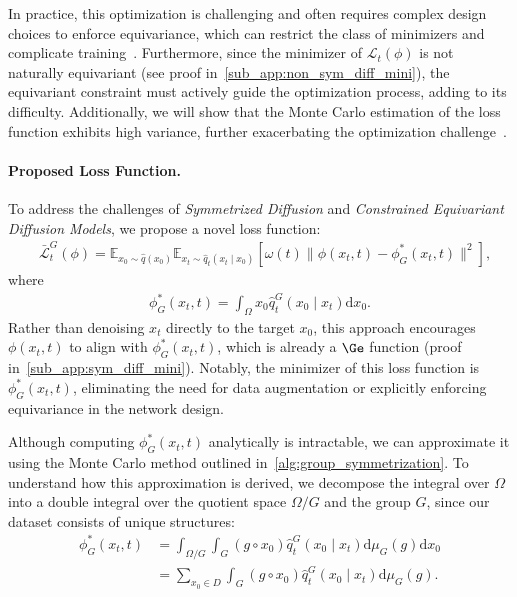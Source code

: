 In practice, this optimization is challenging and often requires complex design choices to enforce equivariance, which can restrict the class of minimizers and complicate training~. Furthermore, since the minimizer of \(\mathcal{L}_t(\phi)\) is not naturally equivariant (see proof in~\cref{sub_app:non_sym_diff_mini}), the equivariant constraint must actively guide the optimization process, adding to its difficulty. Additionally, we will show that the Monte Carlo estimation of the loss function exhibits high variance, further exacerbating the optimization challenge~.


\paragraph{Proposed Loss Function.} To address the challenges of \emph{Symmetrized Diffusion} and \emph{Constrained Equivariant Diffusion Models}, we propose a novel loss function:  
\begin{align} 
\label{eqn:proposed_loss} 
&\bar{\mathcal{L}}^G_t(\phi) = \mathbb{E}_{x_0 \sim \hat{q}(x_0)} \mathbb{E}_{x_t \sim \hat{q}_t(x_t \mid x_0)} \left[ \omega(t) \| \phi(x_t, t) - \phi^*_G(x_t, t) \|^2 \right],
\end{align}
where
\begin{align}
\phi^*_G(x_t, t) = \int_\Omega x_0 \hat{q}^G_t(x_0 \mid x_t) \mathrm{d}x_0. \nonumber
\end{align}
Rather than denoising \(x_t\) directly to the target \(x_0\), this approach encourages \(\phi(x_t, t)\) to align with \(\phi^*_G(x_t, t)\), which is already a \(\Ge\) function (proof in~\cref{sub_app:sym_diff_mini}). Notably, the minimizer of this loss function is \(\phi^*_G(x_t, t)\), eliminating the need for data augmentation or explicitly enforcing equivariance in the network design.

Although computing \(\phi^*_G(x_t, t)\) analytically is intractable, we can approximate it using the Monte Carlo method outlined in~\cref{alg:group_symmetrization}. To understand how this approximation is derived, we decompose the integral over \(\Omega\) into a double integral over the quotient space \(\Omega / G\) and the group \(G\), since our dataset consists of unique structures:  
\begin{align*}
    \phi^*_G(x_t, t) &= \int_{\Omega / G} \int_G (g \circ x_0) \hat{q}^G_t(x_0 \mid x_t) \mathrm{d}\mu_G(g) \mathrm{d}x_0 \\
    &= \sum_{x_0 \in D} \int_G (g \circ x_0) \hat{q}^G_t(x_0 \mid x_t) \mathrm{d}\mu_G(g).
\end{align*}

